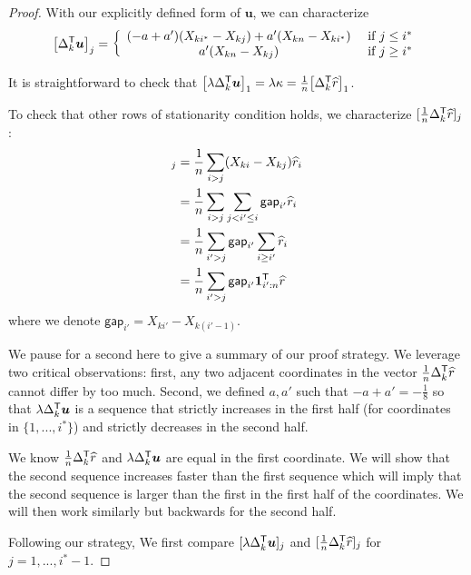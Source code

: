 \begin{proof}
With our explicitly defined form of $\mathbf{u}$, we can characterize
\begin{align}
\big[ \Delta_k^{\mathsf{T}} \mbox{\boldmath $u$} \big]_j = 
  \left \{ \begin{array}{cc} 
   (-a + a')(X_{k i^*} - X_{kj})+ a'(X_{kn} - X_{k i^*})
   & \textrm{ if } j \leq i^* \\
   a'(X_{kn} - X_{kj}) & \textrm{ if } j \geq i^* 
     \end{array} \right.
\end{align} 

It is straightforward to check that $\big[ \lambda \Delta_k^{\mathsf{T}} \mbox{\boldmath $u$} \big]_1 = \lambda \kappa = \frac{1}{n} \big[ \Delta_k^{\mathsf{T}} \widehat{r} \big]_1$.

To check that other rows of stationarity condition holds, we characterize $[\frac{1}{n} \Delta_k^{\mathsf{T}} \widehat{r}]_j$:
\begin{align*}
[\frac{1}{n} \Delta_k^\tran \hat{r}]_j &= \frac{1}{n} \sum_{i > j} (X_{ki} - X_{kj}) \hat{r}_i \\
  & = \frac{1}{n} \sum_{i > j} \sum_{j < i' \leq i} \mathsf{gap}_{i'} \hat{r}_i \\
 & = \frac{1}{n} \sum_{i' > j} \mathsf{gap}_{i'} \sum_{i \geq i'} \hat{r}_i \\
 & = \frac{1}{n} \sum_{i' > j} \mathsf{gap}_{i'} \mathbf{1}_{i':n}^\tran \hat{r} 
\end{align*}
where we denote $\mathsf{gap}_{i'} = X_{ki'} - X_{k(i'-1)}$.

We pause for a second here to give a summary of our proof strategy. We leverage two critical observations: first, any two adjacent coordinates in the vector $\frac{1}{n} \Delta_k^{\mathsf{T}} \widehat{r}$ cannot differ by too much. Second, we defined $a, a'$ such that $-a+a' = -\frac{1}{8}$ so that $\lambda \Delta_k^{\mathsf{T}} \mbox{\boldmath $u$}$ is a sequence that strictly increases in the first half (for coordinates in $\{1,...,i^*\}$) and strictly decreases in the second half. 

We know $\frac{1}{n} \Delta_k^{\mathsf{T}} \widehat{r}$ and $\lambda \Delta_k^{\mathsf{T}} \mbox{\boldmath $u$}$ are equal in the first coordinate. We will show that the second sequence increases faster than the first sequence which will imply that the second sequence is larger than the first in the first half of the coordinates. We will then work similarly but backwards for the second half. 


Following our strategy, We first compare $[\lambda \Delta_k^{\mathsf{T}} \mbox{\boldmath $u$}]_j$ and $[\frac{1}{n} \Delta_k^{\mathsf{T}} \widehat{r}]_j$ for $j=1,..., i^*-1$.


\end{proof}
